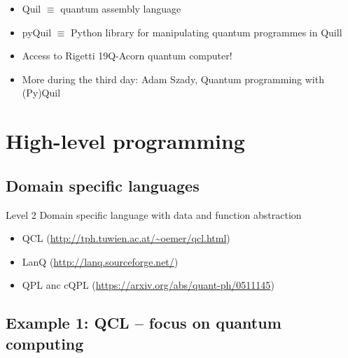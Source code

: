 \documentclass{beamer}
\begin{document}
\begin{frame}{\insertsection}{\insertsubsection}
	\begin{itemize}
        \item<1-> Quil $\equiv$ quantum assembly language
        \item<2-> pyQuil $\equiv$ Python library for manipulating quantum 
        programmes in Quill
        \item<3-> Access to Rigetti 19Q-Acorn quantum computer!
        \item<4-> More during the third day: Adam Szady, Quantum programming 
        with (Py)Quil
    \end{itemize}
\end{frame}


\section{High-level programming}


\subsection{Domain specific languages}

\begin{frame}{\insertsection}{\insertsubsection}

\begin{block}{Level 2}
Domain specific language with data and function abstraction
\end{block}

\begin{itemize}
    \item QCL (\url{http://tph.tuwien.ac.at/~oemer/qcl.html})
    \item LanQ (\url{http://lanq.sourceforge.net/})
    \item QPL anc cQPL (\url{https://arxiv.org/abs/quant-ph/0511145})
\end{itemize}
\end{frame}


\subsection{Example 1: QCL -- focus on quantum computing}
\end{document}

